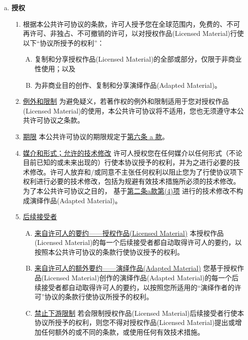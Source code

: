 \begin{enumerate}[a.]
    \item \textbf{授权} \label{entry:A.2.a}
    \begin{enumerate}[1.]
        \item 根据本公共许可协议的条款，许可人授予您在全球范围内，免费的、不可再许可、非独占、不可撤销的许可，以对授权作品(Licensed Material)行使以下“协议所授予的权利”：\label{entry:A.2.a.1}
        \begin{enumerate}[A.]
            \item 复制和分享授权作品(Licensed Material)的全部或部分，仅限于非商业性使用；以及\label{entry:A.2.a.1.A}
            \item 为非商业目的创作、复制和分享演绎作品(Adapted Material)。\label{entry:A.2.a.1.B}
        \end{enumerate}
        \item \underline{例外和限制} 为避免疑义，若著作权的例外和限制适用于您对授权作品(Licensed Material)的使用，本公共许可协议将不适用，您也无须遵守本公共许可协议之条款。\label{entry:A.2.a.2}
        \item \underline{期限} 本公共许可协议的期限规定于\hyperref[entry:A.6.a]{第六条 a 款}。\label{entry:A.2.a.3}
        \item \underline{媒介和形式；允许的技术修改} 许可人授权您在任何媒介以任何形式（不论目前已知的或未来出现的）行使本协议授予的权利，并为之进行必要的技术修改。许可人放弃和/或同意不主张任何权利以阻止您为了行使协议项下权利进行必要的技术修改，包括为规避有效技术措施所必须的技术修改。为了本公共许可协议之目的， 基于\hyperref[entry:A.2.a.4]{第二条a款第(4)项} 进行的技术修改不构成演绎作品(Adapted Material)。\label{entry:A.2.a.4}
        \item \underline{后续接受者} \label{entry:A.2.a.5}
        \begin{enumerate}[A.]
            \item \underline{来自许可人的要约——授权作品(Licensed Material)} 本授权作品(Licensed Material)的每一个后续接受者都自动取得许可人的要约，以按照本公共许可协议的条款行使协议授予的权利。\label{entry:A.2.a.5.A}
            \item \underline{来自许可人的额外要约——演绎作品(Adapted Material)} 您基于授权作品(Licensed Material)创作的演绎作品(Adapted Material)的每一个后续接受者都自动取得许可人的要约，以按照您所适用的“演绎作者的许可”协议的条款行使协议所授予的权利。\label{entry:A.2.a.5.B}
            \item \underline{禁止下游限制} 若会限制授权作品(Licensed Material)后续接受者行使本协议所授予的权利，则您不得对授权作品(Licensed Material)提出或增加任何额外的或不同的条款，或使用任何有效技术措施。\label{entry:A.2.a.5.C}

\end{enumerate}
\end{enumerate}
\end{enumerate}
